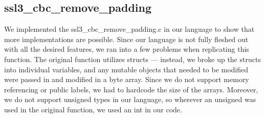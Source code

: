 \subsection{ssl3\_cbc\_remove\_padding}
We implemented the ssl3\_cbc\_remove\_padding.c in our language to show that
more implementations are possible. Since our language is not fully fleshed out
with all the desired features, we ran into a few problems when replicating this
function. The original function utilizes structs --- instead, we broke up the
structs into individual variables, and any mutable objects that needed to be
modified were passed in and modified in a byte array. Since we do not support
memory referencing or public labels, we had to hardcode the size of the arrays.
Moreover, we do not support unsigned types in our language, so wherever an
unsigned was used in the original function, we used an int in our code. 
